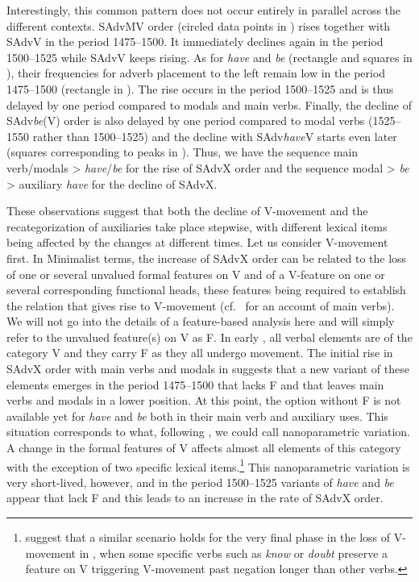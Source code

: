 \documentclass[output=paper]{langsci/langscibook}
\begin{document}
Interestingly, this common pattern does not occur entirely in parallel across
the different contexts. SAdvMV order (circled data points in
) rises together with SAdvV in the period 1475--1500. It
immediately declines again in the period 1500--1525 while SAdvV keeps rising. As
for \emph{have} and \emph{be} (rectangle and squares in
), their frequencies for adverb placement to the left remain
low in the period 1475--1500 (rectangle in ). The rise occurs
in the period 1500--1525 and is thus delayed by one period compared to modals
and main verbs. Finally, the decline of SAdv\emph{be}(V) order is also
delayed by one period compared to modal verbs (1525--1550 rather than 1500--1525)
and the decline with SAdv\emph{have}V starts even later (squares
corresponding to peaks in ). Thus, we have the sequence main
verb/modals > \emph{have}/\emph{be} for the rise of SAdvX order and the
sequence modal > \emph{be} > auxiliary \emph{have} for the decline of
SAdvX.

These observations suggest that both the decline of V-movement and the
recategorization of auxiliaries take place stepwise, with different lexical
items being affected by the changes at different times. Let us consider
V-movement first. In Minimalist terms, the increase of SAdvX order can be
related to the loss of one or several unvalued formal features on V and of a
V-feature on one or several corresponding functional heads, these features
being required to establish the  relation that gives rise to V-movement
(cf.\ \citealt[528ff.]{HaeIhs2016} for an account of main verbs). We will not go
into the details of a feature-based analysis here and will simply refer to the
unvalued feature(s) on V as F. In early , all verbal elements are of the
category V and they carry F as they all undergo movement.  The initial rise in
SAdvX order with main verbs and modals in  suggests that a
new variant of these elements emerges in the period 1475--1500 that lacks F and
that leaves main verbs and modals in a lower position. At this point, the
option without F is not available yet for \emph{have} and \emph{be} both in
their main verb and auxiliary uses. This situation corresponds to what,
following \textcite{BibRob2012b,BibRob2016}, we could call nanoparametric
variation. A change in the formal features of V affects almost all elements of
this category with the exception of two specific lexical
items.\footnote{\citet{BibRob2012b} suggest that a similar scenario holds for
the very final phase in the loss of V-movement in , when some specific
verbs such as \emph{know} or \emph{doubt} preserve a feature on V triggering
V-movement past negation longer than other verbs.} This nanoparametric
variation is very short-lived, however, and in the period 1500--1525 variants
of \emph{have} and \emph{be} appear that lack F and this leads to an increase
in the rate of SAdvX order.
\end{document}
